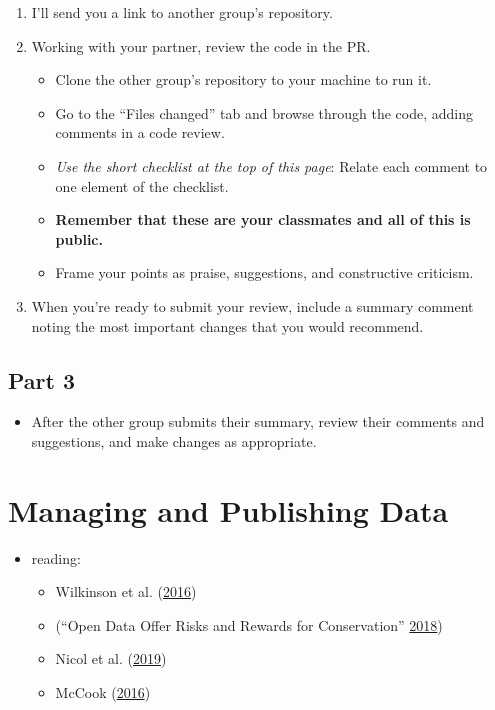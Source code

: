 \documentclass[
]{article}
\providecommand{\tightlist}{%
  \setlength{\itemsep}{0pt}\setlength{\parskip}{0pt}}
\begin{document}
\begin{enumerate}
\def\labelenumi{\arabic{enumi}.}
\item
  I'll send you a link to another group's repository.
\item
  Working with your partner, review the code in the PR.

  \begin{itemize}
  \tightlist
  \item
    Clone the other group's repository to your machine to run it.
  \item
    Go to the ``Files changed'' tab and browse through the code, adding comments in a code review.
  \item
    \emph{Use the short checklist at the top of this page}: Relate each comment to one element of the checklist.
  \item
    \textbf{Remember that these are your classmates and all of this is public.}
  \item
    Frame your points as praise, suggestions, and constructive criticism.
  \end{itemize}
\item
  When you're ready to submit your review, include a summary comment noting the most important changes that you would recommend.
\end{enumerate}

\hypertarget{part-3}{%
\subsection{Part 3}\label{part-3}}

\begin{itemize}
\tightlist
\item
  After the other group submits their summary, review their comments and suggestions, and make changes as appropriate.
\end{itemize}

\hypertarget{managing-and-publishing-data}{%
\section{Managing and Publishing Data}\label{managing-and-publishing-data}}

\begin{itemize}
\tightlist
\item
  reading:

  \begin{itemize}
  \tightlist
  \item
    Wilkinson et al. (\protect\hyperlink{ref-WilkinsonFAIRGuidingPrinciples2016}{2016})
  \item
    (``Open Data Offer Risks and Rewards for Conservation'' \protect\hyperlink{ref-OpenDataOffer2018}{2018})
  \item
    Nicol et al. (\protect\hyperlink{ref-NicolConsentInsufficientData2019}{2019})
  \item
    McCook (\protect\hyperlink{ref-McCookPubliclyAvailableData2016}{2016})
  \end{itemize}
\end{itemize}
\end{document}
